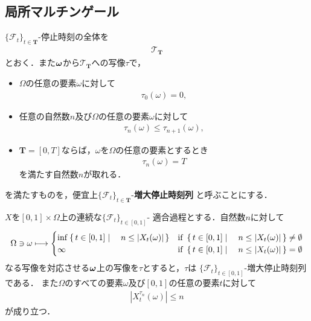 \subsection{局所マルチンゲール}
	
	$\{\mathscr{F}_{t}\}_{t \in \mathbf{T}}$-停止時刻の全体を
	\begin{align}
		\mathscr{T}_{\mathbf{T}}
	\end{align}
	とおく．また${\boldsymbol \omega}$から$\mathscr{T}_{\mathbf{T}}$への写像$\tau$で，
	\begin{itemize}
		\item $\Omega$の任意の要素$\omega$に対して
			\begin{align}
				\tau_{0}(\omega) = 0,
			\end{align}
			
		\item 任意の自然数$n$及び$\Omega$の任意の要素$\omega$に対して
			\begin{align}
				\tau_{n}(\omega) \leq \tau_{n+1}(\omega),
			\end{align}
			
		\item $\mathbf{T} = [0,T]$ならば，$\omega$を$\Omega$の任意の要素とするとき
			\begin{align}
				\tau_{n}(\omega) = T
			\end{align}
			を満たす自然数$n$が取れる．
	\end{itemize}
	
	を満たすものを，便宜上$\{\mathscr{F}_{t}\}_{t \in \mathbf{T}}$-{\bf 増大停止時刻列}
	と呼ぶことにする．
	
	\begin{screen}
		\begin{thm}[連続適合過程で作る増大停止時刻列]
		\label{thm:increasing_stopping_times_made_from_continuous_adapted_process}
			$X$を$[0,1] \times \Omega$上の連続な$\{\mathscr{F}_{t}\}_{t \in [0,1]}$-
			適合過程とする．自然数$n$に対して
			\begin{align}
				\Omega \ni \omega \longmapsto 
				\begin{cases}
					\operatorname*{inf}_{} \left\{\, t \in [0,1] \mid \quad n \leq |X_t(\omega)|\, \right\} & \mbox{if } \left\{\, t \in [0,1] \mid \quad n \leq |X_t(\omega)|\, \right\} \neq \emptyset \\
					\infty & \mbox{if } \left\{\, t \in [0,1] \mid \quad n \leq |X_t(\omega)|\, \right\} = \emptyset
				\end{cases}
			\end{align}
			なる写像を対応させる${\boldsymbol \omega}$上の写像を$\tau$とすると，$\tau$は
			$\{\mathscr{F}_t\}_{t \in [0,1]}$-増大停止時刻列である．
			また$\Omega$のすべての要素$\omega$及び$[0,1]$の任意の要素$t$に対して
			\begin{align}
				\left|X^{\tau_n}_t(\omega)\right| \leq n
			\end{align}
			が成り立つ．
		\end{thm}
	\end{screen}
	

